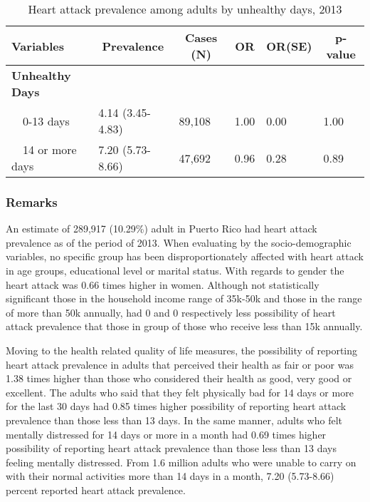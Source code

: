 \begin{table}[H]
\caption{Heart attack prevalence among adults by unhealthy days, 2013\label{tab:unhlthy.Heart_Attack.2013}} 
\begin{center}
\begin{tabular}{llllll}
\hline\hline
\multicolumn{1}{l}{Variables}&\multicolumn{1}{c}{Prevalence}&\multicolumn{1}{c}{Cases (N)}&\multicolumn{1}{c}{OR}&\multicolumn{1}{c}{OR(SE)}&\multicolumn{1}{c}{p-value}\tabularnewline
\hline
{\bfseries Unhealthy Days}&&&&&\tabularnewline
~~0-13 days&4.14 (3.45-4.83)&89,108&1.00&0.00&1.00\tabularnewline
~~14 or more days&7.20 (5.73-8.66)&47,692&0.96&0.28&0.89\tabularnewline
\hline
\end{tabular}\end{center}

\end{table}


 \subsubsection{Remarks}

An estimate of 289,917 
(10.29\%) adult in Puerto Rico had heart attack prevalence as of the period of 2013.
When evaluating by the socio-demographic variables, no specific group has been disproportionately affected with heart attack in age groups, educational level or marital status. With regards to gender the heart attack was 0.66 times higher in women. Although not statistically significant those in the household income range of 35k-50k and those in the range of more than 50k annually, had 0 and 0 respectively less possibility of heart attack prevalence that those  in group of those who receive less than 15k annually.

Moving to the health related quality of life measures, the possibility of reporting heart attack prevalence in adults that perceived their health as fair or poor was 1.38 times higher than those who considered their health as good, very good or excellent. The adults who said that they felt physically bad for 14 days or more for the last 30 days had 0.85 times higher possibility of reporting heart attack prevalence than those less than 13 days. In the same manner, adults who felt mentally distressed for 14 days or more in a month had 0.69 times higher possibility of reporting heart attack prevalence than those less than 13 days feeling mentally distressed. From 1.6 million adults who were unable to carry on with their normal activities more than 14 days in a month, 7.20 (5.73-8.66) percent reported heart attack prevalence. 

